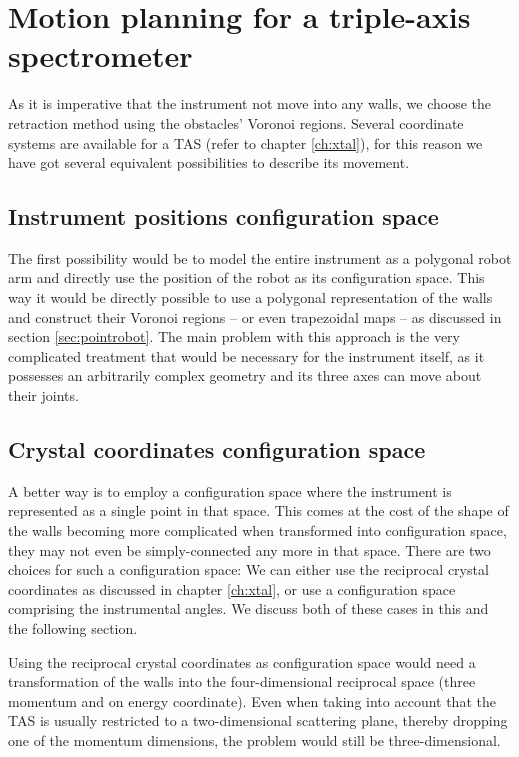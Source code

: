 \section{Motion planning for a triple-axis spectrometer}
\label{sec:tasrobot}

As it is imperative that the instrument not move into any walls, we choose the 
retraction method using the obstacles' Voronoi regions.
Several coordinate systems are available for a TAS (refer to chapter \ref{ch:xtal}), 
for this reason we have got several equivalent possibilities to describe its movement. 


\subsection{Instrument positions configuration space}
The first possibility would be to model the entire instrument as a polygonal 
robot arm and directly use the position of the robot as its configuration space. 
This way it would be directly possible to use a polygonal representation of the 
walls and construct their Voronoi regions -- or even trapezoidal maps -- as 
discussed in section \ref{sec:pointrobot}. The main problem with this approach 
is the very complicated treatment that would be necessary for the instrument 
itself, as it possesses an arbitrarily complex geometry and its three axes
can move about their joints.


\subsection{Crystal coordinates configuration space}
A better way is to employ a configuration space where the instrument is represented 
as a single point in that space. 
This comes at the cost of the shape of the walls becoming more complicated when 
transformed into configuration space, they may not even be simply-connected 
any more in that space. 
There are two choices for such a configuration space: We can either use the 
reciprocal crystal coordinates as discussed in chapter \ref{ch:xtal}, or use a 
configuration space comprising the instrumental angles.
We discuss both of these cases in this and the following section.

Using the reciprocal crystal coordinates as configuration space would need a 
transformation of the walls into the four-dimensional reciprocal space 
(three momentum and on energy coordinate). Even when taking into account that 
the TAS is usually restricted to a two-dimensional scattering plane, thereby 
dropping one of the momentum dimensions, the problem would still be three-dimensional.

